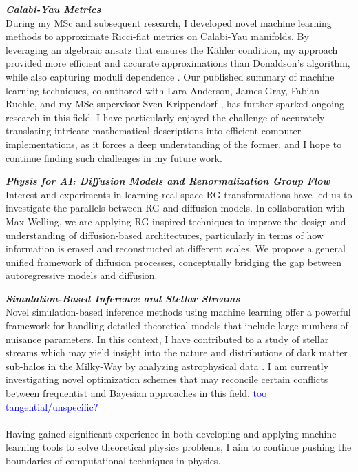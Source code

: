 \documentclass[11pt]{article}
\begin{document}
\textbf{\textit{{Calabi-Yau Metrics}}}\\
During my MSc and subsequent research, I developed novel machine learning methods to approximate Ricci-flat metrics on Calabi-Yau manifolds.
By leveraging an algebraic ansatz that ensures the Kähler condition, my approach provided more efficient and accurate approximations than Donaldson's algorithm, while also capturing moduli dependence \cite{gerdes2023CYJAXPackage}.
Our published summary of machine learning techniques, co-authored with Lara Anderson, James Gray, Fabian Ruehle, and my MSc supervisor Sven Krippendorf \cite{anderson2021ModulidependentCalabiYau}, has further sparked ongoing research in this field.
I have particularly enjoyed the challenge of accurately translating intricate mathematical descriptions into efficient computer implementations, as it forces a deep understanding of the former, and I hope to continue finding such challenges in my future work.

\textbf{\textit{{Physis for AI: Diffusion Models and Renormalization Group Flow}}}\\
Interest and experiments in learning real-space RG transformations have led us to investigate the parallels between RG and diffusion models. In collaboration with Max Welling, we are applying RG-inspired techniques to improve the design and understanding of diffusion-based architectures, particularly in terms of how information is erased and reconstructed at different scales. We propose a general unified framework of diffusion processes, conceptually bridging the gap between autoregressive models and diffusion.

\textbf{\textit{{Simulation-Based Inference and Stellar Streams}}}\\
Novel simulation-based inference methods using machine learning offer a powerful framework for handling detailed theoretical models that include large numbers of nuisance parameters.
In this context, I have contributed to a study of stellar streams which may yield insight into the nature and distributions of dark matter sub-halos in the Milky-Way by analyzing astrophysical data \cite{alvey2023AlbatrossScalable}.
I am currently investigating novel optimization schemes that may reconcile certain conflicts between frequentist and Bayesian approaches in this field. \textcolor{blue}{too tangential/unspecific?}


\paragraph{\color{royalblue}{Research Plans.}}
Having gained significant experience in both developing and applying machine learning tools to solve theoretical physics problems, I aim to continue pushing the boundaries of computational techniques in physics.
\end{document}
